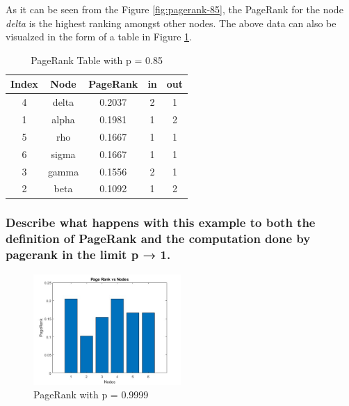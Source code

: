 \documentclass[unicode,11pt,a4paper,oneside,numbers=endperiod,openany]{scrartcl}
\begin{document}
As it can be seen from the Figure \ref{fig:pagerank-85}, the PageRank for the node \textit{delta} is the highest ranking amongst other nodes. The above data can also be visualzed in the form of a table in Figure \ref{tab:pagerank-table-85}.



\noindent
\begin{table}[H]
    \centering
    \begin{tabular}{|c|c|c|c|c|}
        \hline
        Index & Node  & PageRank & in & out \\
        \hline
        4     & delta & 0.2037   & 2  & 1   \\
        \hline
        1     & alpha & 0.1981   & 1  & 2   \\
        \hline
        5     & rho   & 0.1667   & 1  & 1   \\
        \hline
        6     & sigma & 0.1667   & 1  & 1   \\
        \hline
        3     & gamma & 0.1556   & 2  & 1   \\
        \hline
        2     & beta  & 0.1092   & 1  & 2   \\
        \hline
    \end{tabular}
    \caption{PageRank Table with p = 0.85}
    \label{tab:pagerank-table-85}
\end{table}


\subsubsection{Describe what happens with this example to both the definition of PageRank and the computation done by pagerank in the limit p → 1.}

\begin{figure}[H]
    \centering
    \includegraphics[width=0.5\textwidth]{images/pagerank-999.jpg}
    \caption{PageRank with p = 0.9999}
    \label{fig:pagerank-99}
\end{figure}
\end{document}

